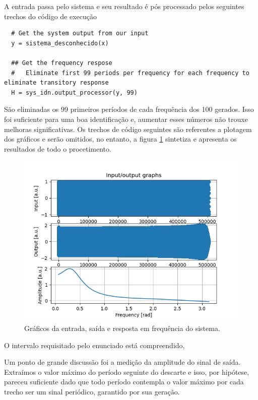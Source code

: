 \documentclass[x11names,a4paper,12pt]{article}
\begin{document}
A entrada passa pelo sistema e seu resultado é pós processado pelos seguintes trechos do código de execução

\begin{verbatim}
  # Get the system output from our input
  y = sistema_desconhecido(x)

  ## Get the frequency respose
  #   Eliminate first 99 periods per frequency for each frequency to eliminate transitory response
  H = sys_idn.output_processor(y, 99)
\end{verbatim}

São eliminadas os 99 primeiros períodos de cada frequência dos 100 gerados. Isso foi suficiente para uma boa identificação e, aumentar esses números não trouxe melhoras significativas. Os trechos de código seguintes são referentes a plotagem dos gráficos e serão omitidos, no entanto, a figura \ref{fig:frequency_response} sintetiza e apresenta os resultados de todo o procetimento.

\begin{figure}[H]
  \centering
  \includegraphics[scale=0.7]{figures/frequency_response.png}
  \caption{Gráficos da entrada, saída e resposta em frequência do sistema.}\label{fig:frequency_response}
\end{figure}

O intervalo requisitado pelo enunciado está compreendido,

Um ponto de grande discussão foi a medição da amplitude do sinal de saída. Extraímos o valor máximo do período seguinte do descarte e isso, por hipótese, pareceu suficiente dado que todo período contempla o valor máximo por cada trecho ser um sinal periódico, garantido por sua geração.
\end{document}
